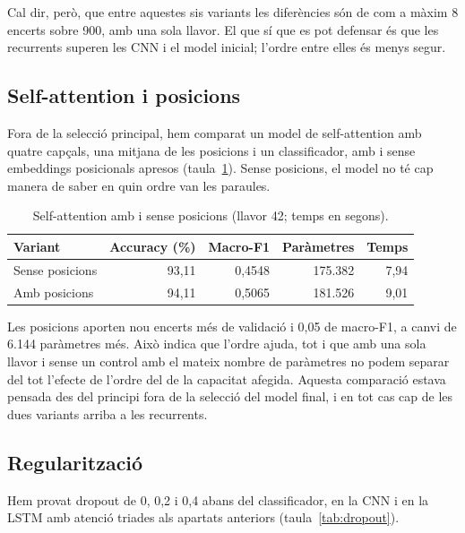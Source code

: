 \documentclass[11pt,a4paper]{article}
\begin{document}
Cal dir, però, que entre aquestes sis variants les diferències són de com a màxim 8 encerts sobre 900, amb una
sola llavor. El que sí que es pot defensar és que les recurrents superen les CNN i el model inicial; l'ordre entre
elles és menys segur.

\subsection{Self-attention i posicions}
\label{sec:sa}

Fora de la selecció principal, hem comparat un model de self-attention amb quatre capçals, una mitjana de les
posicions i un classificador, amb i sense embeddings posicionals apresos (taula~\ref{tab:sa}). Sense posicions,
el model no té cap manera de saber en quin ordre van les paraules.

\begin{table}[ht]
\centering\small
\caption{Self-attention amb i sense posicions (llavor 42; temps en segons).}
\label{tab:sa}
\begin{tabular}{lrrrr}
\toprule
Variant & Accuracy (\%) & Macro-F1 & Paràmetres & Temps\\
\midrule
Sense posicions & 93,11 & 0,4548 & 175.382 & 7,94 \\
Amb posicions & 94,11 & 0,5065 & 181.526 & 9,01 \\
\bottomrule
\end{tabular}
\end{table}

Les posicions aporten nou encerts més de validació i 0,05 de macro-F1, a canvi de 6.144 paràmetres més. Això
indica que l'ordre ajuda, tot i que amb una sola llavor i sense un control amb el mateix nombre de paràmetres no
podem separar del tot l'efecte de l'ordre del de la capacitat afegida. Aquesta comparació estava pensada des del
principi fora de la selecció del model final, i en tot cas cap de les dues variants arriba a les recurrents.

\subsection{Regularització}
\label{sec:dropout}

Hem provat dropout de 0, 0,2 i 0,4 abans del classificador, en la CNN i en la LSTM amb atenció triades als
apartats anteriors (taula~\ref{tab:dropout}).
\end{document}
